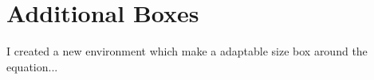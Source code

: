 \section{Additional Boxes}

    I created a new environment which make a adaptable size box around the equation...

